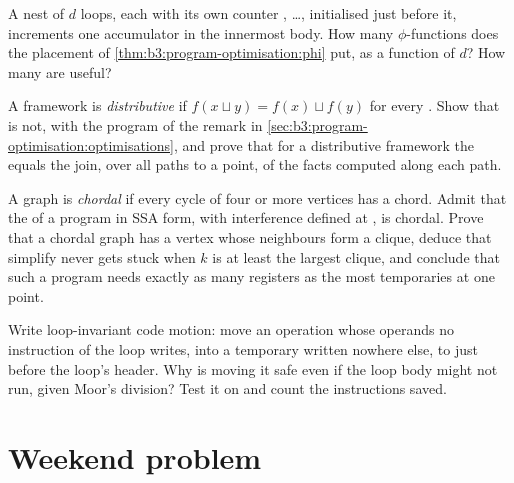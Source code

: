 \begin{exercise}[$\star\star$]\label{exo:b3:program-optimisation:9}
A nest of $d$  loops, each with its own counter , \dots, initialised just before it, increments one accumulator  in the innermost body. How many $\phi$-functions does the placement of \cref{thm:b3:program-optimisation:phi} put, as a function of $d$? How many are useful?
\end{exercise}

\begin{exercise}[$\star\star\star$]\label{exo:b3:program-optimisation:10}
A framework is \emph{distributive} if $f(x \sqcup y) = f(x) \sqcup f(y)$ for every . Show that  is not, with the program of the remark in \cref{sec:b3:program-optimisation:optimisations}, and prove that for a distributive framework the  equals the join, over all paths to a point, of the facts computed along each path.
\end{exercise}

\begin{exercise}[$\star\star\star$]\label{exo:b3:program-optimisation:11}
A graph is \emph{chordal} if every cycle of four or more vertices has a chord. Admit that the  of a program in SSA form, with interference defined at , is chordal. Prove that a chordal graph has a vertex whose neighbours form a clique, deduce that simplify never gets stuck when $k$ is at least the largest clique, and conclude that such a program needs exactly as many registers as the most temporaries  at one point.
\end{exercise}

\begin{exercise}[$\star\star\star$]\label{exo:b3:program-optimisation:12}
Write loop-invariant code motion: move an operation whose operands no instruction of the loop writes, into a temporary written nowhere else, to just before the loop's header. Why is moving it safe even if the loop body might not run, given Moor's division? Test it on  and count the instructions saved.
\end{exercise}

\section{Weekend problem}\label{sec:b3:program-optimisation:problem}

